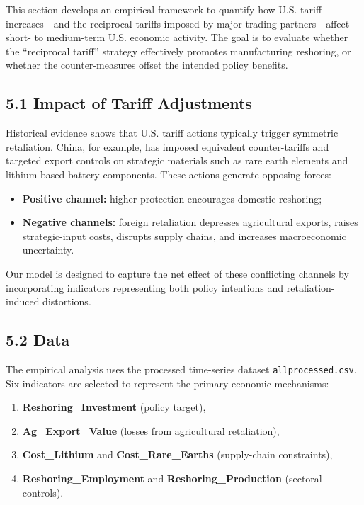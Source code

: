 \documentclass{apmcmthesis}
\begin{document}
This section develops an empirical framework to quantify how U.S. tariff increases---and the reciprocal tariffs imposed by major trading partners---affect short- to medium-term U.S. economic activity. The goal is to evaluate whether the ``reciprocal tariff'' strategy effectively promotes manufacturing reshoring, or whether the counter-measures offset the intended policy benefits.

\subsection*{5.1 Impact of Tariff Adjustments}

Historical evidence shows that U.S. tariff actions typically trigger symmetric retaliation. China, for example, has imposed equivalent counter-tariffs and targeted export controls on strategic materials such as rare earth elements and lithium-based battery components. These actions generate opposing forces:
\begin{itemize}
    \item \textbf{Positive channel:} higher protection encourages domestic reshoring;
    \item \textbf{Negative channels:} foreign retaliation depresses agricultural exports, raises strategic-input costs, disrupts supply chains, and increases macroeconomic uncertainty.
\end{itemize}

Our model is designed to capture the net effect of these conflicting channels by incorporating indicators representing both policy intentions and retaliation-induced distortions.

\subsection*{5.2 Data}

The empirical analysis uses the processed time-series dataset \texttt{allprocessed.csv}. Six indicators are selected to represent the primary economic mechanisms:
\begin{enumerate}
    \item \textbf{Reshoring\_Investment} (policy target),
    \item \textbf{Ag\_Export\_Value} (losses from agricultural retaliation),
    \item \textbf{Cost\_Lithium} and \textbf{Cost\_Rare\_Earths} (supply-chain constraints),
    \item \textbf{Reshoring\_Employment} and \textbf{Reshoring\_Production} (sectoral controls).
\end{enumerate}
\end{document}
